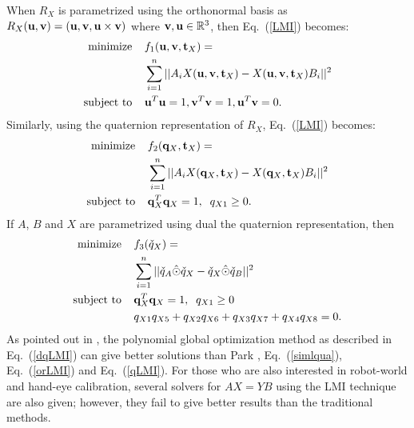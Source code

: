 \documentclass[twocolumn,10pt]{asme2ej}
\newcommand{\uu}{{\bf u}}
\newcommand{\vv}{{\bf v}}
\newcommand{\ttt}{{\bf t}}
\newcommand{\qq}{{\bf q}}
\begin{document}
When $R_X$ is parametrized using the orthonormal basis as $R_{X}(\uu, \vv) = ( \uu, \vv, \uu \times \vv)$ where $\vv, \uu \in \mathbb{R}^{3}$, then Eq.~(\ref{LMI}) becomes:
\begin{equation}
\begin{split}
\text{minimize} \; \; \; \;&f_{1}(\uu, \vv, \ttt_{X}) = \\
&\sum_{i=1}^n ||A_i X(\uu,\vv,\ttt_{X}) - X(\uu,\vv,\ttt_{X})B_i ||^2\\
\text{subject to} \; \; \; \; &\uu^{T}\uu = 1, \vv^{T}\vv = 1, \uu^{T}\vv = 0.
\end{split}
\label{orLMI}
\end{equation}
Similarly, using the quaternion representation of $R_{X}$, Eq.~(\ref{LMI}) becomes:
\begin{equation}
\begin{split}
\text{minimize} \; \; \; \; &f_{2}(\qq_{X}, \ttt_{X}) = \\
& \sum_{i=1}^{n}||A_iX(\qq_{X}, \ttt_{X}) - X(\qq_{X}, \ttt_{X})B_i||^{2}\\
\text{subject to} \; \; \; \; &\qq_{X}^{T}\qq_{X} = 1, \; \; q_{X1} \geq 0.
\end{split}
\label{qLMI}
\end{equation}
If $A$, $B$ and $X$ are parametrized using dual the quaternion representation, then
\begin{equation}
\begin{split}
\text{minimize} \; \; \; \; &f_{3}(\check{q}_{X}) = \\
 & \sum_{i=1}^{n}||\check{q}_{A} \hat{\odot} \check{q}_{X}- \check{q}_{X} \hat{\odot} \check{q}_{B}||^{2}\\
\text{subject to} \; \; \; \; &\qq_{X}^{T}\qq_{X} = 1, \; \; q_{X1} \geq 0 \\
&q_{X1}q_{X5} + q_{X2}q_{X6} + q_{X3}q_{X7} + q_{X4}q_{X8} = 0.
\end{split}
\label{dqLMI}
\end{equation} 
As pointed out in \cite{heller2014hand}, the polynomial global optimization method as described in Eq.~(\ref{dqLMI}) can give better solutions than Park \cite{park1994robot}, Eq.~(\ref{simlqua}), Eq.~(\ref{orLMI}) and Eq.~(\ref{qLMI}). For those who are also interested in robot-world and hand-eye calibration, several solvers for $AX=YB$ 
using the LMI technique are also given; however, they fail to give better results than the traditional methods.
\end{document}
